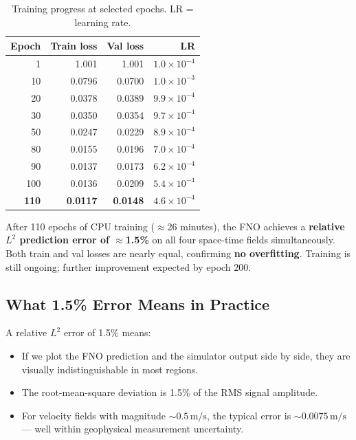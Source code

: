 \documentclass[12pt, a4paper]{article}
\theoremstyle{definition}
\begin{document}
\begin{table}[H]
  \centering
  \caption{Training progress at selected epochs.  LR = learning rate.}
  \label{tab:train_progress}
  \begin{tabular}{rrrr}
    \toprule
    \textbf{Epoch} & \textbf{Train loss} & \textbf{Val loss} & \textbf{LR} \\
    \midrule
    1   & 1.001  & 1.001  & $1.0\times10^{-4}$ \\
    10  & 0.0796 & 0.0700 & $1.0\times10^{-3}$ \\
    20  & 0.0378 & 0.0389 & $9.9\times10^{-4}$ \\
    30  & 0.0350 & 0.0354 & $9.7\times10^{-4}$ \\
    50  & 0.0247 & 0.0229 & $8.9\times10^{-4}$ \\
    80  & 0.0155 & 0.0196 & $7.0\times10^{-4}$ \\
    90  & 0.0137 & 0.0173 & $6.2\times10^{-4}$ \\
    100 & 0.0136 & 0.0209 & $5.4\times10^{-4}$ \\
    \textbf{110} & \textbf{0.0117} & \textbf{0.0148} & $4.6\times10^{-4}$ \\
    \bottomrule
  \end{tabular}
\end{table}

\begin{tcolorbox}[highlight=mygreen, title=Headline Result]
  After 110 epochs of CPU training ($\approx$26 minutes), the FNO achieves a
  \textbf{relative $L^2$ prediction error of $\approx$1.5\%} on all four
  space-time fields simultaneously.  Both train and val losses are nearly equal,
  confirming \textbf{no overfitting}.  Training is still ongoing; further
  improvement expected by epoch 200.
\end{tcolorbox}

\subsection{What 1.5\% Error Means in Practice}

A relative $L^2$ error of 1.5\% means:
\begin{itemize}
  \item If we plot the FNO prediction and the simulator output side by side,
    they are visually indistinguishable in most regions.
  \item The root-mean-square deviation is 1.5\% of the RMS signal amplitude.
  \item For velocity fields with magnitude $\sim 0.5\,\text{m/s}$, the typical
    error is $\sim 0.0075\,\text{m/s}$ — well within geophysical measurement
    uncertainty.
\end{itemize}
\end{document}
